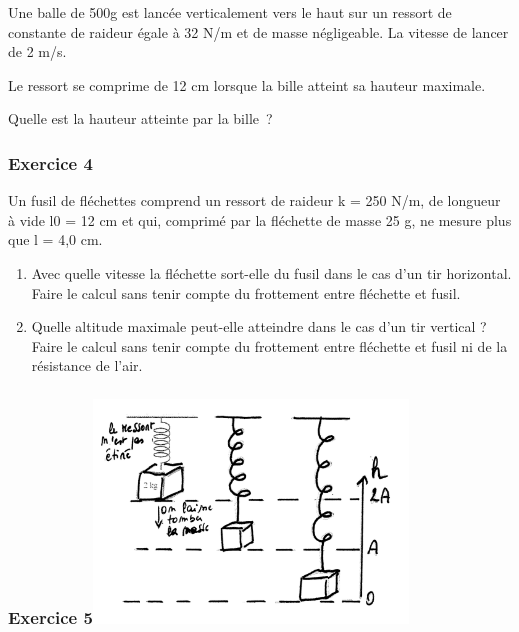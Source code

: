 Une balle de 500g est lancée verticalement vers le haut sur un ressort
de constante de raideur égale à 32 N/m et de masse négligeable. La
vitesse de lancer de 2 m/s.

Le ressort se comprime de 12 cm lorsque la bille atteint sa hauteur
maximale.

Quelle est la hauteur atteinte par la bille~?

\hypertarget{exercice-4}{%
\subsubsection[Exercice
4]{\texorpdfstring{\protect\hypertarget{anchor-10}{}{}Exercice
4}{Exercice 4}}\label{exercice-4}}

Un fusil de fléchettes comprend un ressort de raideur k = 250 N/m, de
longueur à vide l0 = 12 cm et qui, comprimé par la fléchette de masse 25
g, ne mesure plus que l = 4,0 cm.

\begin{enumerate}
\def\labelenumi{\arabic{enumi}.}
\item
  Avec quelle vitesse la fléchette sort-elle du fusil dans le cas d'un
  tir horizontal. Faire le calcul sans tenir compte du frottement entre
  fléchette et fusil.
\item
  Quelle altitude maximale peut-elle atteindre dans le cas d'un tir
  vertical ? Faire le calcul sans tenir compte du frottement entre
  fléchette et fusil ni de la résistance de l'air.
\end{enumerate}

\hypertarget{exercice-5}{%
\subsubsection[Exercice
5]{\texorpdfstring{\protect\hypertarget{anchor-11}{}{}Exercice
5\protect\includegraphics[width=8.373cm,height=5.95cm]{Pictures/10000000000013A000000DF82AB24E2F70D0A5A2.png}}{Exercice 5}}\label{exercice-5}}

